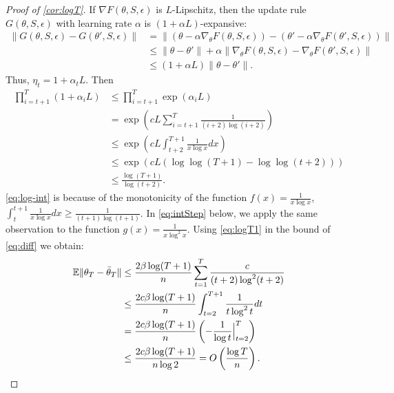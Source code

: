 \begin{proof}[Proof of \cref{cor:logT}]
    If $\nabla F(\theta, S, \epsilon)$ is $L$-Lipschitz, then the update rule $G(\theta, S, \epsilon)$ with learning rate $\alpha$ is $(1 + \alpha L)$-expansive:
    \begin{align}
        \lVert G(\theta, S, \epsilon) - G(\theta', S, \epsilon)  \rVert &= \lVert (\theta - \alpha \nabla_\theta F(\theta, S, \epsilon)) - (\theta' - \alpha \nabla_\theta F(\theta', S, \epsilon))\rVert \\
        &\leq \lVert \theta - \theta' \rVert + \alpha \lVert \nabla_\theta F(\theta, S, \epsilon) - \nabla_\theta F(\theta', S, \epsilon) \rVert \\
        &\leq (1 + \alpha L) \lVert \theta - \theta' \rVert.
    \end{align}
    Thus, $\eta_t = 1 + \alpha_t L$. Then
    \begin{align}
        \prod_{i=t+1}^T (1 + \alpha_i L) &\leq \prod_{i=t+1}^T \exp(\alpha_i L) \\
        &= \exp\left(cL\sum_{i=t+1}^T \frac{1}{(i+2) \log (i+2)} \right) \\
        \label{eq:log-int}
        &\leq \exp \left( cL \int_{t+2}^{T+1} \frac{1}{x\log x} dx \right) \\
        &\leq \exp \left(cL (\log \log (T+1) - \log \log (t+2))  \right) \\
        &\leq \frac{\log (T+1)}{\log (t+2)}. \label{eq:logT1}
    \end{align}
    \cref{eq:log-int} is because of the monotonicity of the function $f(x)=\frac{1}{x \log x}$, $\int_{t}^{t+1} \frac{1}{x \log x} dx \geq \frac{1}{(t+1) \log (t+1)}$. 
    In \eqref{eq:intStep} below, we apply the same observation to the function $g(x) = \frac{1}{x \log^2 x}$.
    Using \eqref{eq:logT1} in the bound of \cref{eq:diff} we obtain:
    \begin{align}
        \mathbb{E}\lVert \theta_{T} - \Bar{\theta}_T \rVert &\leq \frac{2\beta \log (T+1)}{n} \sum_{t=1}^T \frac{c}{(t+2) \log^2 (t+2)} \\
        &\leq \frac{2c\beta \log (T+1)}{n} \int_{t=2}^{T+1} \frac{1}{t\log^2 t} dt \label{eq:intStep}\\
        &= \frac{2c\beta \log (T+1)}{n} \left( -\frac{1}{\log t} \Big\vert_{t=2}^T \right) \\
        &\leq \frac{2c\beta \log (T+1)}{n \log 2} = O \left(\frac{\log T}{n} \right).
    \end{align}
\end{proof}


